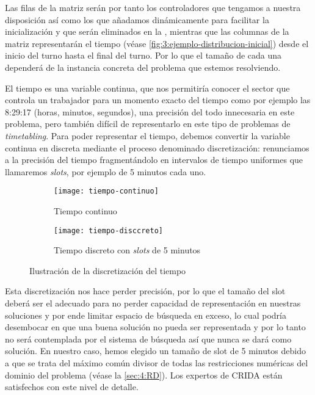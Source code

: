 Las filas de la matriz serán por tanto los controladores que tengamos a nuestra disposición así como los que añadamos dinámicamente para facilitar la inicialización y que serán eliminados en la \fasedos{}, mientras que las columnas de la matriz representarán el tiempo (véase \autoref{fig:3:ejemplo-distribucion-inicial}) desde el inicio del turno hasta el final del turno. Por lo que el tamaño de cada una dependerá de la instancia concreta del problema que estemos 
resolviendo.

El tiempo es una variable continua, que nos permitiría conocer el sector que controla un trabajador para un momento exacto del tiempo como por ejemplo las 8:29:17 (horas, minutos, segundos), una precisión del todo innecesaria en este problema, pero también difícil de representarlo en este tipo de problemas de \textit{timetabling}. Para poder 
representar el tiempo, debemos convertir la variable continua en discreta mediante el proceso denominado 
discretización: renunciamos a la precisión del tiempo fragmentándolo en intervalos de tiempo uniformes que llamaremos \textit{slots}, por ejemplo de 5 minutos cada uno.

\begin{figure}[htbp]
	\begin{subfigure}{\linewidth}
		\centering
		\texttt{[image: tiempo-continuo]}
		\caption{Tiempo continuo}
		\label{fig:timepo-continuo}
	\end{subfigure}
	
	\begin{subfigure}{\linewidth}
		\centering
		\texttt{[image: tiempo-disccreto]}
		\caption{Tiempo discreto con \textit{slots} de 5 minutos}
		\label{fig:timepo-disccreto}
	\end{subfigure}
	
	\caption{Ilustración de la discretización del tiempo}
\end{figure}

Esta discretización nos hace perder precisión, por lo que el tamaño del slot deberá ser el adecuado para no perder capacidad de representación en nuestras soluciones y por ende limitar espacio de búsqueda en exceso, lo cual podría desembocar en que una buena solución no pueda ser representada y por lo tanto no será contemplada por el sistema de búsqueda así que nunca se dará como solución.
En nuestro caso, hemos elegido un tamaño de slot de 5 minutos debido a que se trata del máximo común divisor de todas las restricciones numéricas del dominio del problema (véase la \autoref{sec:4:RD}). Los expertos de \gls{CRIDA} están satisfechos con este nivel de detalle.

